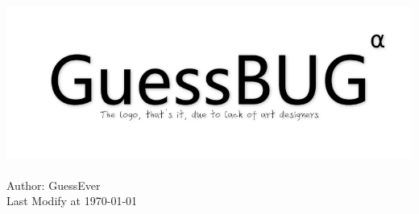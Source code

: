 \begin{center}
	\pagestyle{empty}
	~\\[100pt]
	\includegraphics[width=7in]{../upload/site/logo1.png}
	~\\[50pt]
	\Huge Author: GuessEver \\[20pt]
	\Large Last Modify at \today\\
	\clearpage
\end{center}
